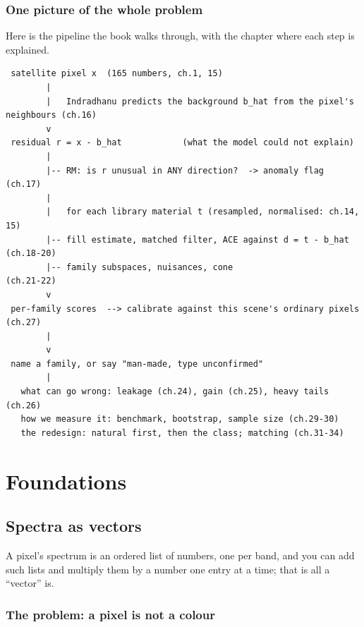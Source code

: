 \documentclass[11pt,a4paper,oneside,openany]{book}
\begin{document}
\section*{One picture of the whole problem}

Here is the pipeline the book walks through, with the chapter where each step is explained.

\begingroup\small
\begin{verbatim}
 satellite pixel x  (165 numbers, ch.1, 15)
        |
        |   Indradhanu predicts the background b_hat from the pixel's neighbours (ch.16)
        v
 residual r = x - b_hat            (what the model could not explain)
        |
        |-- RM: is r unusual in ANY direction?  -> anomaly flag      (ch.17)
        |
        |   for each library material t (resampled, normalised: ch.14, 15)
        |-- fill estimate, matched filter, ACE against d = t - b_hat  (ch.18-20)
        |-- family subspaces, nuisances, cone                         (ch.21-22)
        v
 per-family scores  --> calibrate against this scene's ordinary pixels (ch.27)
        |
        v
 name a family, or say "man-made, type unconfirmed"
        |
   what can go wrong: leakage (ch.24), gain (ch.25), heavy tails (ch.26)
   how we measure it: benchmark, bootstrap, sample size (ch.29-30)
   the redesign: natural first, then the class; matching (ch.31-34)
\end{verbatim}
\endgroup

\mainmatter
\part{Foundations}

\chapter{Spectra as vectors}
\label{ch:vectors}

\begin{onething}
A pixel's spectrum is an ordered list of numbers, one per band, and you can add such lists and multiply them by a
number one entry at a time; that is all a ``vector'' is.
\end{onething}

\section{The problem: a pixel is not a colour}
\end{document}
